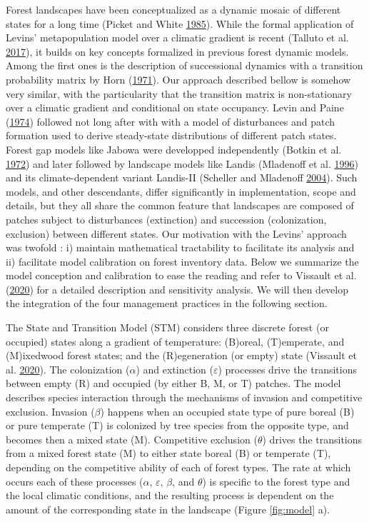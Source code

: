 \documentclass[12pt]{article}
\begin{document}
Forest landscapes have been conceptualized as a dynamic mosaic of
different states for a long time (Picket and White
\protect\hyperlink{ref-PICKETT1985}{1985}). While the formal application
of Levins' metapopulation model over a climatic gradient is recent
(Talluto et al. \protect\hyperlink{ref-Talluto2017}{2017}), it builds on
key concepts formalized in previous forest dynamic models. Among the
first ones is the description of successional dynamics with a transition
probability matrix by Horn
(\protect\hyperlink{ref-horn1971adaptive}{1971}). Our approach described
bellow is somehow very similar, with the particularity that the
transition matrix is non-stationary over a climatic gradient and
conditional on state occupancy. Levin and Paine
(\protect\hyperlink{ref-Levin1974}{1974}) followed not long after with
with a model of disturbances and patch formation used to derive
steady-state distributions of different patch states. Forest gap models
like Jabowa were developped independently (Botkin et al.
\protect\hyperlink{ref-Botkin1972}{1972}) and later followed by
landscape models like Landis (Mladenoff et al.
\protect\hyperlink{ref-Mladenoff1996}{1996}) and its climate-dependent
variant Landis-II (Scheller and Mladenoff
\protect\hyperlink{ref-Scheller2004}{2004}). Such models, and other
descendants, differ significantly in implementation, scope and details,
but they all share the common feature that landscapes are composed of
patches subject to disturbances (extinction) and succession
(colonization, exclusion) between different states. Our motivation with
the Levins' approach was twofold : i) maintain mathematical tractability
to facilitate its analysis and ii) facilitate model calibration on
forest inventory data. Below we summarize the model conception and
calibration to ease the reading and refer to Vissault et al.
(\protect\hyperlink{ref-Vissault2020}{2020}) for a detailed description
and sensitivity analysis. We will then develop the integration of the
four management practices in the following section.

The State and Transition Model (STM) considers three discrete forest (or
occupied) states along a gradient of temperature: (B)oreal, (T)emperate,
and (M)ixedwood forest states; and the (R)egeneration (or empty) state
(Vissault et al. \protect\hyperlink{ref-Vissault2020}{2020}). The
colonization (\(\alpha\)) and extinction (\(\varepsilon\)) processes
drive the transitions between empty (R) and occupied (by either B, M, or
T) patches. The model describes species interaction through the
mechanisms of invasion and competitive exclusion. Invasion (\(\beta\))
happens when an occupied state type of pure boreal (B) or pure temperate
(T) is colonized by tree species from the opposite type, and becomes
then a mixed state (M). Competitive exclusion (\(\theta\)) drives the
transitions from a mixed forest state (M) to either state boreal (B) or
temperate (T), depending on the competitive ability of each of forest
types. The rate at which occurs each of these processes (\(\alpha\),
\(\varepsilon\), \(\beta\), and \(\theta\)) is specific to the forest
type and the local climatic conditions, and the resulting process is
dependent on the amount of the corresponding state in the landscape
(Figure \ref{fig:model} a).
\end{document}
